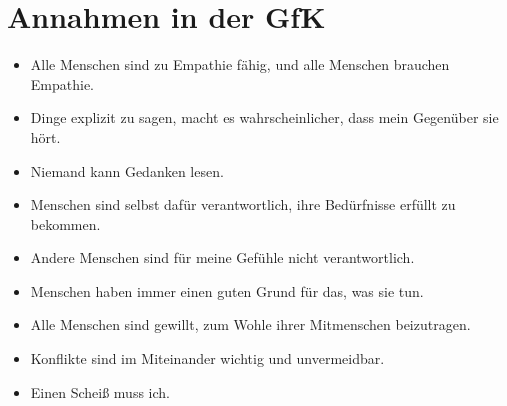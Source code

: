 \section{Annahmen in der GfK}
\label{gfk-annahmen}

\begin{itemize}
  \item Alle Menschen sind zu Empathie fähig, und alle Menschen brauchen Empathie.
  \item Dinge explizit zu sagen, macht es wahrscheinlicher, dass mein Gegenüber sie hört.
  \item Niemand kann Gedanken lesen.
  \item Menschen sind selbst dafür verantwortlich, ihre Bedürfnisse erfüllt zu bekommen.
  \item Andere Menschen sind für meine Gefühle nicht verantwortlich.
  \item Menschen haben immer einen guten Grund für das, was sie tun.
  \item Alle Menschen sind gewillt, zum Wohle ihrer Mitmenschen beizutragen.
  \item Konflikte sind im Miteinander wichtig und unvermeidbar.
  \item Einen Scheiß muss ich.
\end{itemize}
